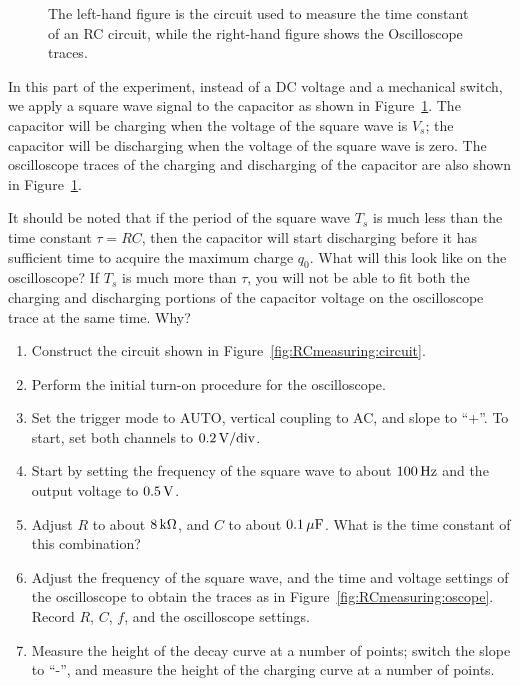 \documentclass[12pt]{article}
\begin{document}
\begin{figure}
  \centering
   \qquad
  \caption{The left-hand figure is the circuit used to measure the
    time constant of an RC circuit, while the right-hand figure shows
    the Oscilloscope traces.}
  \label{fig:RCmeasuring}
\end{figure}
In this part of the experiment, instead of a DC voltage and a
mechanical switch, we apply a square wave signal to the capacitor as
shown in Figure~\ref{fig:RCmeasuring}.  The capacitor will be charging
when the voltage of the square wave is $V_s$; the capacitor will be
discharging when the voltage of the square wave is zero.  The
oscilloscope traces of the charging and discharging of the capacitor
are also shown in Figure~\ref{fig:RCmeasuring}.

It should be noted that if the period of the square wave $T_s$ is much
less than the time constant $\tau = RC$, then the capacitor will start
discharging before it has sufficient time to acquire the maximum
charge $q_0$.  What will this look like on the oscilloscope?  If $T_s$
is much more than $\tau$, you will not be able to fit both the
charging and discharging portions of the capacitor voltage on the
oscilloscope trace at the same time.  Why?

\begin{enumerate}
\item Construct the circuit shown in
  Figure~\ref{fig:RCmeasuring:circuit}.
\item Perform the initial turn-on procedure for the oscilloscope.
\item Set the trigger mode to AUTO, vertical coupling to AC, and slope
  to ``+''.  To start, set both channels to $\unit[0.2]{V/div}$.
\item Start by setting the frequency of the square wave to about
  $\unit[100]{Hz}$ and the output voltage to $\unit[0.5]{V}$.
\item Adjust $R$ to about $\unit[8]{k\Omega}$, and $C$ to about
  $\unit[0.1]{\mu F}$.  What is the time constant of this combination?
\item Adjust the frequency of the square wave, and the time and
  voltage settings of the oscilloscope to obtain the traces as in
  Figure~\ref{fig:RCmeasuring:oscope}.  Record $R$, $C$, $f$, and the
  oscilloscope settings.
\item Measure the height of the decay curve at a number of points;
  switch the slope to ``-'', and measure the height of the charging
  curve at a number of points.
\end{enumerate}
\end{document}
